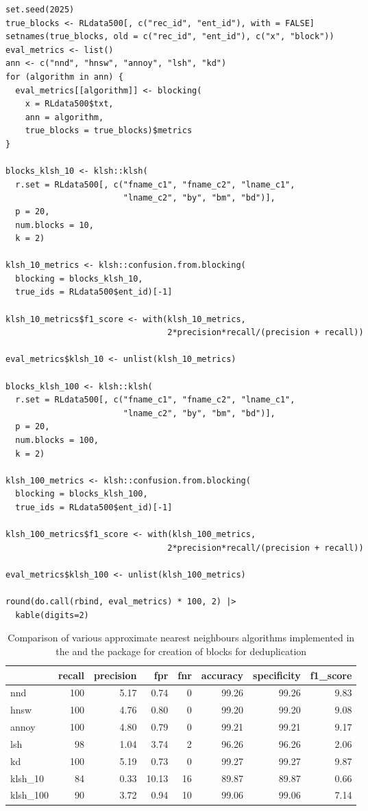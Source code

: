 \begin{verbatim}
set.seed(2025)
true_blocks <- RLdata500[, c("rec_id", "ent_id"), with = FALSE]
setnames(true_blocks, old = c("rec_id", "ent_id"), c("x", "block"))
eval_metrics <- list()
ann <- c("nnd", "hnsw", "annoy", "lsh", "kd")
for (algorithm in ann) {
  eval_metrics[[algorithm]] <- blocking(
    x = RLdata500$txt,
    ann = algorithm,
    true_blocks = true_blocks)$metrics
}

blocks_klsh_10 <- klsh::klsh(
  r.set = RLdata500[, c("fname_c1", "fname_c2", "lname_c1",
                        "lname_c2", "by", "bm", "bd")],
  p = 20,
  num.blocks = 10,
  k = 2)

klsh_10_metrics <- klsh::confusion.from.blocking(
  blocking = blocks_klsh_10, 
  true_ids = RLdata500$ent_id)[-1]

klsh_10_metrics$f1_score <- with(klsh_10_metrics, 
                                 2*precision*recall/(precision + recall))

eval_metrics$klsh_10 <- unlist(klsh_10_metrics)

blocks_klsh_100 <- klsh::klsh(
  r.set = RLdata500[, c("fname_c1", "fname_c2", "lname_c1",
                        "lname_c2", "by", "bm", "bd")],
  p = 20,
  num.blocks = 100,
  k = 2)

klsh_100_metrics <- klsh::confusion.from.blocking(
  blocking = blocks_klsh_100, 
  true_ids = RLdata500$ent_id)[-1]

klsh_100_metrics$f1_score <- with(klsh_100_metrics, 
                                 2*precision*recall/(precision + recall))

eval_metrics$klsh_100 <- unlist(klsh_100_metrics)

round(do.call(rbind, eval_metrics) * 100, 2) |>
  kable(digits=2) 
\end{verbatim}

\begin{table}

\caption{\label{tab:tab-comparision}Comparison of various approximate nearest neighbours algorithms implemented in the  and the  package for creation of blocks for deduplication}
\centering
\begin{tabular}[t]{l|r|r|r|r|r|r|r}
\hline
  & recall & precision & fpr & fnr & accuracy & specificity & f1\_score\\
\hline
nnd & 100 & 5.17 & 0.74 & 0 & 99.26 & 99.26 & 9.83\\
\hline
hnsw & 100 & 4.76 & 0.80 & 0 & 99.20 & 99.20 & 9.08\\
\hline
annoy & 100 & 4.80 & 0.79 & 0 & 99.21 & 99.21 & 9.17\\
\hline
lsh & 98 & 1.04 & 3.74 & 2 & 96.26 & 96.26 & 2.06\\
\hline
kd & 100 & 5.19 & 0.73 & 0 & 99.27 & 99.27 & 9.87\\
\hline
klsh\_10 & 84 & 0.33 & 10.13 & 16 & 89.87 & 89.87 & 0.66\\
\hline
klsh\_100 & 90 & 3.72 & 0.94 & 10 & 99.06 & 99.06 & 7.14\\
\hline
\end{tabular}
\end{table}

